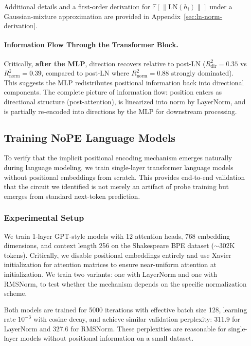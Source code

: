 \documentclass[11pt]{article}
\begin{document}
Additional details and a first-order derivation for $\mathbb{E}[\|\text{LN}(h_i)\|]$ under a Gaussian-mixture approximation are provided in Appendix~\ref{sec:ln-norm-derivation}.

\paragraph{Information Flow Through the Transformer Block.}
Critically, \textbf{after the MLP}, direction recovers relative to post-LN ($R^2_{\text{dir}}=0.35$ vs $R^2_{\text{norm}}=0.39$, compared to post-LN where $R^2_{\text{norm}}=0.88$ strongly dominated). This suggests the MLP redistributes positional information back into directional components. The complete picture of information flow: position enters as directional structure (post-attention), is linearized into norm by LayerNorm, and is partially re-encoded into directions by the MLP for downstream processing.

\subsection{Training NoPE Language Models}

To verify that the implicit positional encoding mechanism emerges naturally during language modeling, we train single-layer transformer language models without positional embeddings from scratch. This provides end-to-end validation that the circuit we identified is not merely an artifact of probe training but emerges from standard next-token prediction.

\subsubsection{Experimental Setup}

We train 1-layer GPT-style models with 12 attention heads, 768 embedding dimensions, and context length 256 on the Shakespeare BPE dataset ($\sim$302K tokens). Critically, we disable positional embeddings entirely and use Xavier initialization for attention matrices to ensure near-uniform attention at initialization. We train two variants: one with LayerNorm and one with RMSNorm, to test whether the mechanism depends on the specific normalization scheme.

Both models are trained for 5000 iterations with effective batch size 128, learning rate $10^{-3}$ with cosine decay, and achieve similar validation perplexity: 311.9 for LayerNorm and 327.6 for RMSNorm. These perplexities are reasonable for single-layer models without positional information on a small dataset.
\end{document}
